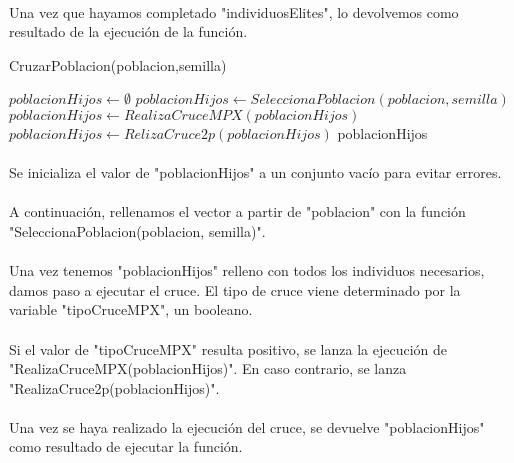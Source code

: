 	\paragraph{}Una vez que hayamos completado "individuosElites", lo devolvemos como resultado de la ejecución de la función.

	\begin{algorithm}[H]
		\caption{CruzarPoblacion(poblacion,semilla)}
		\begin{algorithmic}
			\STATE $poblacionHijos \leftarrow \emptyset$
			\STATE $poblacionHijos \leftarrow SeleccionaPoblacion(poblacion,semilla)$
			\STATE $poblacionHijos \leftarrow RealizaCruceMPX(poblacionHijos)$
			\ELSE
			\STATE $poblacionHijos \leftarrow RelizaCruce2p(poblacionHijos)$
			\ENDIF
			\RETURN poblacionHijos
		\end{algorithmic}
	\end{algorithm}

	\paragraph{}Se inicializa el valor de "poblacionHijos" a un conjunto vacío para evitar errores.
	
	\paragraph{}A continuación, rellenamos el vector a partir de "poblacion" con la función "SeleccionaPoblacion(poblacion, semilla)".
	
	\paragraph{}Una vez tenemos "poblacionHijos" relleno con todos los individuos necesarios, damos paso a ejecutar el cruce. El tipo de cruce viene determinado por la variable "tipoCruceMPX", un booleano.
	
	\paragraph{}Si el valor de "tipoCruceMPX" resulta positivo, se lanza la ejecución de "RealizaCruceMPX(poblacionHijos)". En caso contrario, se lanza "RealizaCruce2p(poblacionHijos)".
	
	\paragraph{} Una vez se haya realizado la ejecución del cruce, se devuelve "poblacionHijos" como resultado de ejecutar la función.

